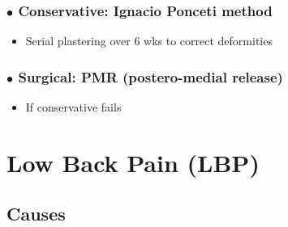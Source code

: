 \documentclass[
  14pt,
]{memoir}
\providecommand{\tightlist}{%
  \setlength{\itemsep}{0pt}\setlength{\parskip}{0pt}}
\begin{document}
\hypertarget{bullet-conservative-ignacio-ponceti-method}{%
\subsubsection{\texorpdfstring{\(\bullet\) Conservative: Ignacio Ponceti
method}{\textbackslash bullet Conservative: Ignacio Ponceti method}}\label{bullet-conservative-ignacio-ponceti-method}}

\begin{itemize}
\tightlist
\item
  Serial plastering over 6 wks to correct deformities
\end{itemize}

\hypertarget{bullet-surgical-pmr-postero-medial-release}{%
\subsubsection{\texorpdfstring{\(\bullet\) Surgical: PMR (postero-medial
release)}{\textbackslash bullet Surgical: PMR (postero-medial release)}}\label{bullet-surgical-pmr-postero-medial-release}}

\begin{itemize}
\tightlist
\item
  If conservative fails
\end{itemize}

\pagebreak

\hypertarget{low-back-pain-lbp}{%
\section{Low Back Pain (LBP)}\label{low-back-pain-lbp}}

\hypertarget{causes}{%
\subsection{Causes}\label{causes}}
\end{document}
